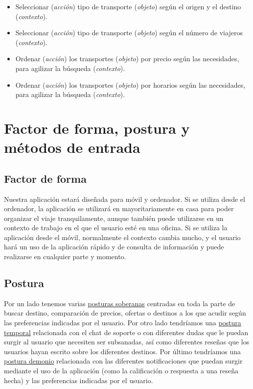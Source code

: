 \begin{itemize}
    \item Seleccionar (\textit{acción}) tipo de transporte (\textit{objeto}) según el origen y el destino (\textit{contexto}).
    \item Seleccionar (\textit{acción}) tipo de transporte (\textit{objeto}) según el número de viajeros (\textit{contexto}).
    \item Ordenar (\textit{acción}) los transportes (\textit{objeto}) por precio según las necesidades, para agilizar la búsqueda (\textit{contexto}).
    \item Ordenar (\textit{acción}) los transportes (\textit{objeto}) por horarios según las necesidades, para agilizar la búsqueda (\textit{contexto}).
\end{itemize}

\section{Factor de forma, postura y métodos de entrada}
\subsection{Factor de forma}
Nuestra aplicación estará diseñada para móvil y ordenador. Si se utiliza desde el ordenador, la aplicación se utilizará en mayoritariamente en casa para 
poder organizar el viaje  tranquilamente, aunque también puede utilizarse en un contexto de trabajo en el que el usuario esté en una oficina. Si se utiliza 
la aplicación desde el móvil, normalmente el contexto cambia mucho, y el usuario hará un uso de la aplicación rápido y de consulta de información y puede 
realizarse en cualquier parte y momento.

\subsection{Postura}
Por un lado tenemos varias \underline{posturas soberanas} centradas en toda la parte de buscar destino, comparación de precios, ofertas o destinos a los que acudir 
según las preferencias indicadas por el usuario. Por otro lado tendríamos una \underline{postura temporal} relacionada con el chat de soporte o con diferentes dudas 
que le puedan surgir al usuario que necesiten ser subsanadas, así como diferentes reseñas que los usuarios hayan escrito sobre los diferentes destinos. Por último 
tendríamos una \underline{postura demonio} relacionada con las diferentes notificaciones que puedan surgir mediante el uso de la aplicación (como la calificación o 
respuesta a una reseña hecha) y las preferencias indicadas por el usuario.


